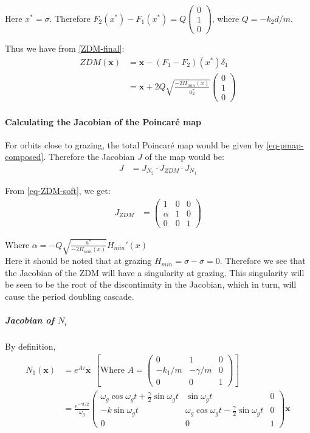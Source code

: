 \documentclass{book}
\renewcommand{\(}{\begin{columns}}
\renewcommand{\)}{\end{columns}}
\newcommand{\<}[1]{\begin{column}{#1}}
\renewcommand{\>}{\end{column}}
\newcommand{\colvt}[3]{\begin{pmatrix}#1\\#2\\#3\end{pmatrix}}
\newcommand{\bb}[1]{\textbf{#1}}
\newcommand{\para}{\paragraph}
\newcommand{\subpara}{\subparagraph}
\begin{document}
Here $x^*=\sigma$.  
Therefore $F_2(x^*)-F_1(x^*)=Q\colvt{0}{1}{0}$, where $Q=-k_2d/m$.  

Thus we have from \eqref{ZDM-final}:
\begin{align}
\label{eq-ZDM-soft}
ZDM(\bb{x})&=\bb{x}-(F_1-F_2)(x^*)\delta_1\\
&=\bb{x}+2Q\sqrt{\frac{-2H_{min}(x)}{a_2^*}}\colvt{0}{1}{0}
\end{align}


\para{Calculating the Jacobian of the Poincaré map}
For orbits close to grazing, the total Poincaré map would be given by 
\eqref{eq-pmap-composed}. Therefore the Jacobian $J$ of the map would be:
\begin{align}
\label{eq-jacob-composed}
{J}&={J_{N_2}}\cdot{J_{ZDM}}\cdot{J_{N_1}}
\end{align}


From \eqref{eq-ZDM-soft}, we get:
\begin{align}
\label{eq-jacob-soft}
J_{ZDM}&=
\begin{pmatrix}
1 & 0 & 0\\
\alpha & 1 & 0\\
0 & 0 & 1
\end{pmatrix}
\end{align}

Where $\alpha=-Q\sqrt{\frac{a^*}{-2H_{min}(x)}}H_{min}'(x)$\\
Here it should be noted that at grazing 
$H_{min}=\sigma-\sigma=0$.  Therefore we see that the Jacobian of the ZDM will 
have a singularity at grazing.  This singularity will be seen to be the root 
of the discontinuity in the Jacobian, which in turn, will cause the period 
doubling cascade.  

\subpara{Jacobian of  $N_i$\\}

By definition,
\begin{align}
\label{eq-Nmatrix}
N_1(\bb{x})&=e^{A\tau}\bb{x}~~\left[\text{Where }A=
\begin{pmatrix}
0 & 1 & 0\\
-k_1/m & -\gamma/m & 0\\
0 & 0 & 1
\end{pmatrix}\right]
\\
&=\frac{e^{-\gamma t/2}}{\omega_g}
\begin{pmatrix}
\omega_g\cos{\omega_g t}+\frac{\gamma}{2}\sin{\omega_g t} & \sin{\omega_g t} & 0\\
-k\sin{\omega_g t} & \omega_g\cos{\omega_g t}-\frac{\gamma}{2}\sin{\omega_g t} 
& 0\\
0 & 0 & 1
\end{pmatrix}\bb{x}
\end{align}
\end{document}
